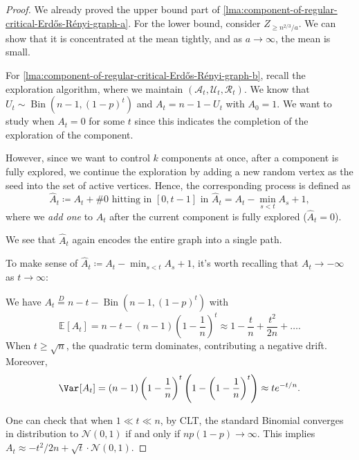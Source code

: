 \begin{proof}
	We already proved the upper bound part of \autoref{lma:component-of-regular-critical-Erdős-Rényi-graph-a}. For the lower bound, consider \(Z_{\geq n^{2 / 3} / a}\). We can show that it is concentrated at the mean tightly, and as \(a \to \infty \), the mean is small.

	For \autoref{lma:component-of-regular-critical-Erdős-Rényi-graph-b}, recall the exploration algorithm, where we maintain \((\mathcal{A} _t, \mathcal{U} _t, \mathcal{R} _t)\). We know that \(U_t \sim \operatorname{Bin}(n-1, (1-p)^t) \) and \(A_t = n-1-U_t\) with \(A_0 = 1\). We want to study when \(A_t = 0\) for some \(t\) since this indicates the completion of the exploration of the component.

	However, since we want to control \(k\) components at once, after a component is fully explored, we continue the exploration by adding a new random vertex as the seed into the set of active vertices. Hence, the corresponding process is defined as
	\[
		\hat{A} _t
		\coloneqq A_t + \text{\#0 hitting in \([0, t-1]\) in \(\hat{A}_t\)}
		= A_t - \min _{s < t} A_s + 1,
	\]
	where we \emph{add one} to \(A_t\) after the current component is fully explored (\(\hat{A} _t = 0\)).

	\begin{intuition}
		We see that \(\hat{A} _t\) again encodes the entire graph into a single path.
	\end{intuition}

	To make sense of \(\hat{A} _t \coloneqq A_t - \min _{s < t} A_s + 1\), it's worth recalling that \(A_t \to -\infty \) as \(t \to \infty \):

	\begin{prev}
		We have \(A_t \overset{D}{=} n-t-\operatorname{Bin}(n-1, (1-p)^t) \) with
		\[
			\mathbb{E}_{}[A_t]
			= n - t - (n-1) \left( 1 - \frac{1}{n} \right) ^t
			\approx 1 - \frac{t}{n} + \frac{t^2}{2n} + \dots.
		\]
		When \(t \geq \sqrt{n} \), the quadratic term dominates, contributing a negative drift. Moreover,
		\[
			\Var_{}[A_t] = (n-1)\left( 1 - \frac{1}{n} \right) ^t \left( 1 - \left( 1 - \frac{1}{n} \right) ^t \right)
			\approx t e^{-t / n}.
		\]
	\end{prev}

	One can check that when \(1 \ll t \ll n\), by CLT, the standard Binomial converges in distribution to \(\mathcal{N} (0, 1)\) if and only if \(n p (1 - p) \to \infty \). This implies \(A_t \approx - t^2 / 2n + \sqrt{t} \cdot \mathcal{N} (0, 1) \).


\end{proof}
